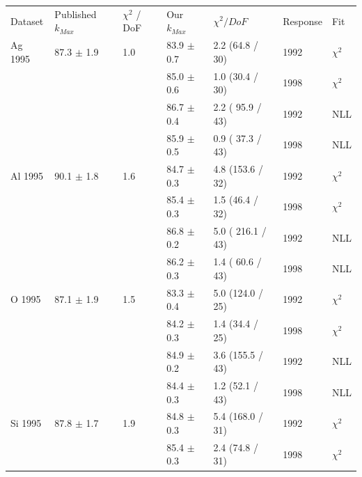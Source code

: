 \begin{table}[H]
  \begin{center}
    \begin{tabular}{|l||l|l|l|l|l|l|}
      \hline
      Dataset & Published $k_{Max}$ & $\chi^2$ / DoF & Our $k_{Max}$ & $\chi^2 / DoF$  & Response & Fit \\
      \hhline{|=||=|=|=|=|=|=|}
       Ag 1995   & 87.3 $\pm$ 1.9 & 1.0 & 83.9 $\pm$ 0.7 & 2.2 (64.8 / 30)  & 1992 & $\chi^2$ \\  
                 &                &     & 85.0 $\pm$ 0.6 & 1.0 (30.4 / 30)  & 1998 & $\chi^2$ \\  
                                                                            
                &                &     & 86.7 $\pm$ 0.4 & 2.2 ( 95.9 / 43) & 1992 & NLL \\
                &                &     & 85.9 $\pm$ 0.5 & 0.9 ( 37.3 / 43) & 1998 & NLL \\      
      \hline                           
       Al 1995   & 90.1 $\pm$ 1.8 & 1.6 & 84.7 $\pm$ 0.3 & 4.8 (153.6 / 32) & 1992 & $\chi^2$ \\  
                 &                &     & 85.4 $\pm$ 0.3 & 1.5 (46.4 / 32)  & 1998 & $\chi^2$ \\  
                                        
                &                &     & 86.8 $\pm$ 0.2 & 5.0 ( 216.1 / 43) & 1992 & NLL \\
                &                &     & 86.2 $\pm$ 0.3 & 1.4 ( 60.6 / 43) & 1998 & NLL \\
      \hline                           
       O 1995    & 87.1 $\pm$ 1.9 & 1.5 & 83.3 $\pm$ 0.4 & 5.0 (124.0 / 25) & 1992 & $\chi^2$ \\  
                 &                &     & 84.2 $\pm$ 0.3 & 1.4 (34.4 / 25)  & 1998 & $\chi^2$ \\  
                                        
                &                &     & 84.9 $\pm$ 0.2 & 3.6 (155.5 / 43) & 1992 & NLL\\
                &                &     & 84.4 $\pm$ 0.3 & 1.2 (52.1 / 43)  & 1998 & NLL\\
      \hline                                                                    
       Si 1995   & 87.8 $\pm$ 1.7 & 1.9 & 84.8 $\pm$ 0.3 & 5.4 (168.0 / 31) & 1992 & $\chi^2$ \\  
                 &                &     & 85.4 $\pm$ 0.3 & 2.4 (74.8 / 31)  & 1998 & $\chi^2$ \\  
                                                                            

\end{tabular}
\end{center}
\end{table}
